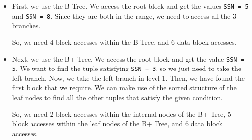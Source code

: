 \documentclass[a4paper, openany]{memoir}
\theoremstyle{definition}
\begin{document}
\begin{answer}
    \begin{itemize}
        \item First, we use the B Tree. We access the root block and get the values \texttt{SSN = 5} and \texttt{SSN = 8}. Since they are both in the range, we need to access all the 3 branches. 
        
        So, we need 4 block accesses within the B Tree, and 6 data block accesses.

        \item Next, we use the B+ Tree. We access the root block and get the value \texttt{SSN = 5}. We want to find the tuple satisfying \texttt{SSN = 3}, so we just need to take the left branch. Now, we take the left branch in level 1. Then, we have found the first block that we require. We can make use of the sorted structure of the leaf nodes to find all the other tuples that satisfy the given condition. 
        
        So, we need 2 block accesses within the internal nodes of the B+ Tree, 5 block accesses within the leaf nodes of the B+ Tree, and 6 data block accesses.
    \end{itemize}    
\end{answer}

\end{document}

